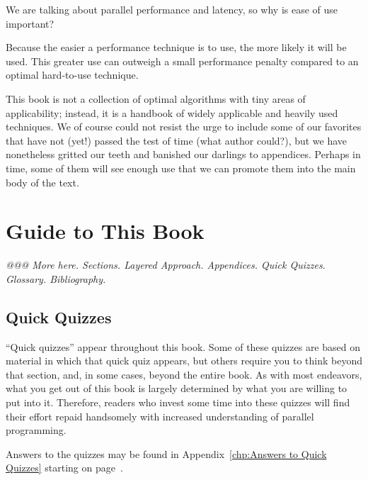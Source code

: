 We are talking about parallel performance and latency,
so why is ease of use important?

Because the easier a performance technique is to use, the more likely
it will be used.
This greater use can outweigh a small performance penalty compared
to an optimal hard-to-use technique.

This book is not a collection of optimal algorithms with tiny areas of
applicability; instead, it is a handbook of widely applicable and heavily
used techniques.
We of course could not resist the urge to include some of our favorites
that have not (yet!) passed the test of time (what author could?), but
we have nonetheless gritted our teeth and banished our darlings to
appendices.
Perhaps in time, some of them will see enough use that we can promote
them into the main body of the text.

\section{Guide to This Book}
\label{sec:intro:Guide to This Book}

\emph{@@@ More here.  Sections.  Layered Approach.  Appendices.
Quick Quizzes.  Glossary.  Bibliography.}

\subsection{Quick Quizzes}

``Quick quizzes'' appear throughout this book.
Some of these quizzes are based on material in which that quick quiz
appears, but others require you to think beyond that section, and,
in some cases, beyond the entire book.
As with most endeavors, what you get out of this book is largely
determined by what you are willing to put into it.
Therefore, readers who invest some time into these quizzes will
find their effort repaid handsomely with increased understanding
of parallel programming.

Answers to the quizzes may be found
in
Appendix~\ref{chp:Answers to Quick Quizzes} starting on
page~\pageref{chp:Answers to Quick Quizzes}.

 \QuickQuizEnd

 \QuickQuizEnd

